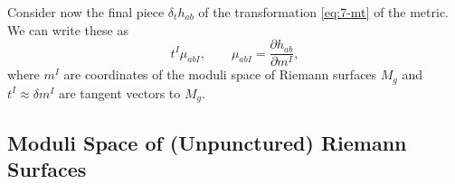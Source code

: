 
Consider now the final piece $\delta_t h_{ab}$ of the transformation \eqref{eq:7-mt} of the metric.
We can write these as
\begin{equation}
  t^I \mu_{abI}, \qquad \mu_{abI} = \frac{\partial h_{ab}}{\partial m^I},
\end{equation}
where $m^I$ are coordinates of the moduli space of Riemann surfaces $M_g$ and $t^I \approx \delta m^I$ are tangent vectors to $M_g$.

\subsection{Moduli Space of (Unpunctured) Riemann Surfaces}%
\label{sub:moduli_space_of_unpunctured_riemann_surfaces}

